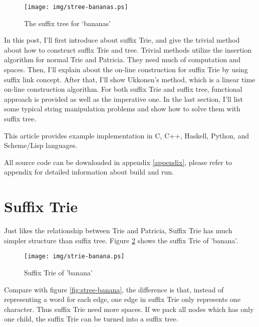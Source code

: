 \documentclass{article}
\begin{document}
\begin{figure}[htbp]
       \begin{center}
	\texttt{[image: img/stree-bananas.ps]}
        \caption{The suffix tree for `bananas'} \label{fig:stree-bananas}
       \end{center}
\end{figure}

In this post, I'll first introduce about suffix Trie, and give the trivial method
about how to construct suffix Trie and tree. Trivial methods utilize the insertion
algorithm for normal Trie and Patricia. They need much of computation and spaces.
Then, I'll explain about the on-line construction for suffix Trie by using suffix link
concept. After that, I'll show Ukkonen's method, which is a linear time on-line 
construction algorithm. For both suffix Trie and suffix tree, functional approach
is provided as well as the imperative one. In the last section, I'll list some
typical string manipulation problems and show how to solve them with suffix tree.

This article provides example implementation in C, C++, Haskell, Python, and 
Scheme/Lisp languages. 

All source code can be downloaded in appendix \ref{appendix}, please 
refer to appendix for detailed information about build and run.

\section{Suffix Trie}
\label{suffix-trie}

Just likes the relationship between Trie and Patricia, Suffix Trie has much simpler
structure than suffix tree. Figure \ref{fig:strie-banana} shows the suffix Trie of
'banana'.

\begin{figure}[htbp]
       \begin{center}
	\texttt{[image: img/strie-banana.ps]}
        \caption{Suffix Trie of 'banana'} \label{fig:strie-banana}
       \end{center}
\end{figure}

Compare with figure \ref{fig:stree-banana}, the difference is that, instead of representing
a word for each edge, one edge in suffix Trie only represents one character. Thus
suffix Trie need more spaces. If we pack all nodes which has only one child, the suffix
Trie can be turned into a suffix tree.
\end{document}
